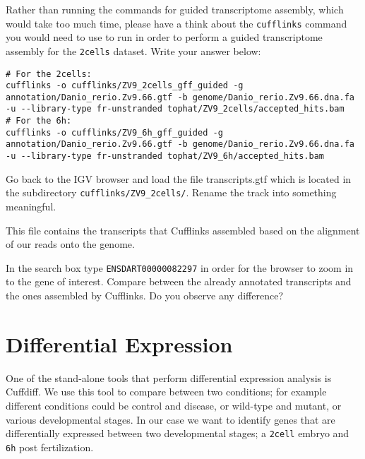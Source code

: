 \begin{questions}
Rather than running the commands for guided transcriptome assembly, which would
take too much time, please have a think about the \texttt{cufflinks} command you would
need to use to run in order to perform a guided transcriptome assembly
for the \texttt{2cells} dataset. Write your answer below:
\begin{answer}
\begin{lstlisting}
# For the 2cells:
cufflinks -o cufflinks/ZV9_2cells_gff_guided -g annotation/Danio_rerio.Zv9.66.gtf -b genome/Danio_rerio.Zv9.66.dna.fa -u --library-type fr-unstranded tophat/ZV9_2cells/accepted_hits.bam
# For the 6h:
cufflinks -o cufflinks/ZV9_6h_gff_guided -g annotation/Danio_rerio.Zv9.66.gtf -b genome/Danio_rerio.Zv9.66.dna.fa -u --library-type fr-unstranded tophat/ZV9_6h/accepted_hits.bam
\end{lstlisting}
\end{answer}

\end{questions}

\begin{steps}
Go back to the IGV browser and load the file transcripts.gtf which is located
in the subdirectory \texttt{cufflinks/ZV9\_2cells/}. Rename the track into
something meaningful.

This file contains the transcripts that Cufflinks assembled based on the
alignment of our reads onto the genome.
\end{steps}

\begin{questions}
In the search box type \texttt{ENSDART00000082297} in order for the browser to zoom in
to the gene of interest. Compare between the already annotated transcripts and
the ones assembled by Cufflinks. Do you observe any difference?
\begin{answer}
\end{answer}

\end{questions}

\section{Differential Expression}
One of the stand-alone tools that perform differential expression analysis is
Cuffdiff. We use this tool to compare between two conditions; for example
different conditions could be control and disease, or wild-type and mutant, or
various developmental stages. In our case we want to identify genes that are
differentially expressed between two developmental stages; a \texttt{2cell}
embryo and \texttt{6h} post fertilization.

